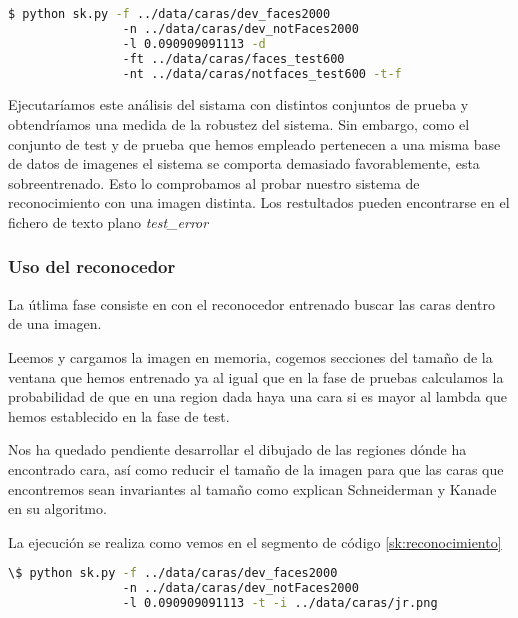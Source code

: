 \begin{lstlisting}[language=bash,label=sk:test,caption=Ejecución en modo pruebas]
$ python sk.py -f ../data/caras/dev_faces2000 
                -n ../data/caras/dev_notFaces2000 
                -l 0.090909091113 -d 
                -ft ../data/caras/faces_test600 
                -nt ../data/caras/notfaces_test600 -t-f
\end{lstlisting}

Ejecutaríamos este análisis del sistama con distintos conjuntos de prueba y obtendríamos una medida de la robustez del sistema. Sin embargo, como el conjunto de test y de prueba que hemos empleado pertenecen a una misma base de datos de imagenes el sistema se comporta demasiado favorablemente, esta sobreentrenado. Esto lo comprobamos al probar nuestro sistema de reconocimiento con una imagen distinta. Los restultados pueden encontrarse en el fichero de texto plano \textit{test\_error}

\subsubsection{Uso del reconocedor}
La útlima fase consiste en con el reconocedor entrenado buscar las caras dentro de una imagen.\par
Leemos y cargamos la imagen en memoria, cogemos secciones del tamaño de la ventana que hemos entrenado ya al igual que en la fase de pruebas calculamos la probabilidad de que en una region dada haya una cara si es mayor al lambda que hemos establecido en la fase de test. \par

Nos ha quedado pendiente desarrollar el dibujado de las regiones dónde ha encontrado cara, así como reducir el tamaño de la imagen para que las caras que encontremos sean invariantes al tamaño como explican Schneiderman y Kanade en su algoritmo.\par

La ejecución  se realiza como vemos en el segmento de código \ref{sk:reconocimiento}
\begin{lstlisting}[language=bash,label=sk:reconocimiento,caption=Ejecución en modo reconocedor]
\$ python sk.py -f ../data/caras/dev_faces2000 
                -n ../data/caras/dev_notFaces2000
                -l 0.090909091113 -t -i ../data/caras/jr.png
\end{lstlisting}
